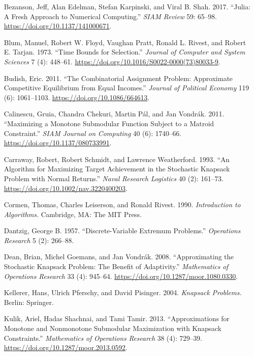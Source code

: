 \documentclass[11pt]{article} %
\newif\ifen
\theoremstyle{definition}
\theoremstyle{definition}
\begin{document}
Bezanson, Jeff, Alan Edelman, Stefan Karpinski, and Viral B. Shah. 2017. ``Julia: A Fresh Approach to Numerical Computing.'' \emph{SIAM Review} 59: 65–98. \url{https://doi.org/10.1137/141000671}.

Blum,  Manuel, Robert W. Floyd, Vaughan Pratt, Ronald L. Rivest, and Robert E. Tarjan. 1973. ``Time Bounds for Selection.'' \emph{Journal of Computer and System Sciences} 7 (4): 448--61. \url{https://doi.org/10.1016/S0022-0000(73)80033-9}.

Budish, Eric. 2011. ``The Combinatorial Assignment Problem: Approximate Competitive Equilibrium from Equal Incomes.'' \emph{Journal of Political Economy} 119 (6): 1061--1103. \url{https://doi.org/10.1086/664613}. 

Calinescu, Gruia, Chandra Chekuri, Martin Pál, and Jan Vondrák. 2011. ``Maximizing a Monotone Submodular Function Subject to a Matroid Constraint.'' \emph{SIAM Journal on Computing} 40 (6): 1740--66. \url{https://doi.org/10.1137/080733991}.

Carraway, Robert, Robert Schmidt, and Lawrence Weatherford. 1993. ``An Algorithm for Maximizing Target Achievement in the Stochastic Knapsack Problem with Normal Returns.'' \emph{Naval Research Logistics} 40 (2): 161--73. \url{https://doi.org/10.1002/nav.3220400203}.

Cormen, Thomas, Charles Leiserson, and Ronald Rivest. 1990. \emph{Introduction to Algorithms.} Cambridge, MA: The MIT Press.

Dantzig, George B. 1957. ``Discrete-Variable Extremum Problems.'' \emph{Operations Research} 5 (2): 266--88.

Dean, Brian, Michel Goemans, and Jan Vondr\'ak. 2008. ``Approximating the Stochastic Knapsack Problem: The Benefit of Adaptivity.'' \emph{Mathematics of Operations Research} 33 (4): 945--64. \url{https://doi.org/10.1287/moor.1080.0330}.

Kellerer, Hans, Ulrich Pferschy, and David Pisinger. 2004. \emph{Knapsack Problems.} Berlin: Springer.

Kulik, Ariel, Hadas Shachnai, and Tami Tamir. 2013. ``Approximations for Monotone and Nonmonotone Submodular Maximization with Knapsack Constraints.'' \emph{Mathematics of Operations Research} 38 (4): 729--39. \url{https://doi.org/10.1287/moor.2013.0592}.

\ifen Jeon, Minhee. 2015. ``[College application strategy] Six chances total\dots divide applications across reach, target, and safety schools'' (in Korean). Jungang Ilbo, Aug. 26. \url{https://doi.org/10.1086/664613}\fi
\end{document}
